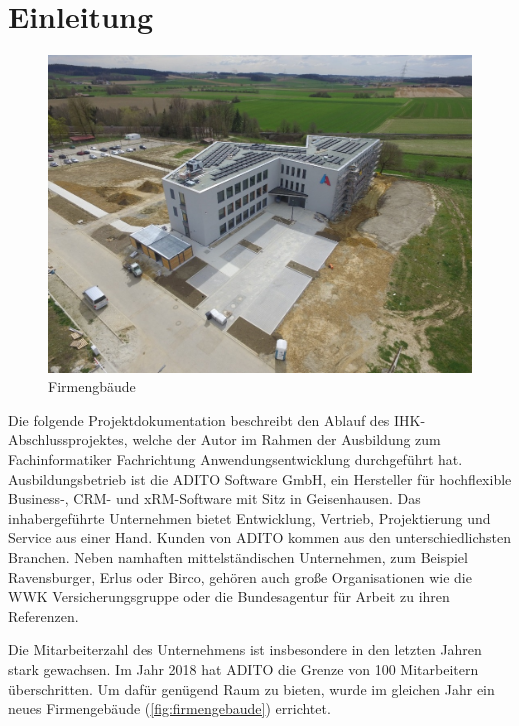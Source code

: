\setcounter{page}{1}
\section{Einleitung}

\begin{figure}
	\vspace{-12px}
	\centering
	\includegraphics[width=1\linewidth]{../graphic/images/firma/Firmengebaude}
	\caption{Firmengbäude}
	\label{fig:firmengebaude}
\end{figure}

Die folgende Projektdokumentation beschreibt den Ablauf des IHK-Abschlussprojektes, welche der Autor im Rahmen der Ausbildung zum Fachinformatiker Fachrichtung Anwendungsentwicklung durchgeführt hat. Ausbildungsbetrieb ist die ADITO Software GmbH, ein Hersteller für hochflexible Business-, CRM- und xRM-Software mit Sitz in Geisenhausen. Das inhabergeführte Unternehmen bietet Entwicklung, Vertrieb, Projektierung und Service aus einer Hand. Kunden von ADITO kommen aus den unterschiedlichsten Branchen. Neben namhaften mittelständischen Unternehmen, zum Beispiel Ravensburger, Erlus oder Birco, gehören auch große Organisationen wie die WWK Versicherungsgruppe oder die Bundesagentur für Arbeit zu ihren Referenzen.

Die Mitarbeiterzahl des Unternehmens ist insbesondere in den letzten Jahren stark gewachsen. Im Jahr 2018 hat ADITO die Grenze von 100 Mitarbeitern überschritten. Um dafür genügend Raum zu bieten, wurde im gleichen Jahr ein neues Firmengebäude (\autoref{fig:firmengebaude}) errichtet.

